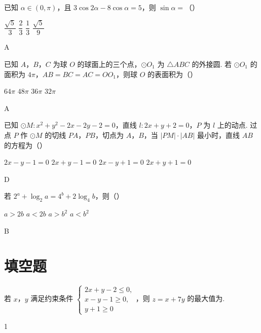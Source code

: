 \begin{problem}
已知 \(\alpha\in\left( 0,\pi \right)\)，且 \(3\cos 2\alpha-8\cos\alpha=5\)，则 \(\sin\alpha=\)（\quad）

\choices
    {\(\dfrac{\sqrt{5}}{3}\)}
    {\(\dfrac{2}{3}\)}
    {\(\dfrac{1}{3}\)}
    {\(\dfrac{\sqrt{5}}{9}\)}

\begin{answer}
A
\end{answer}
\end{problem}

\begin{problem}
已知 \(A\)，\(B\)，\(C\) 为球 \(O\) 的球面上的三个点，\(\odot O_1\) 为 \(\triangle ABC\) 的外接圆. 若 \(\odot O_1\) 的面积为 \(4\pi\)，\(AB=BC=AC=OO_1\)，则球 \(O\) 的表面积为（\quad）

\choices
    {\(64\pi\)}
    {\(48\pi\)}
    {\(36\pi\)}
    {\(32\pi\)}

\begin{answer}
A
\end{answer}
\end{problem}

\begin{problem}
已知 \(\odot M:x^2+y^2-2x-2y-2=0\)，直线 \(l:2x+y+2=0\)，\(P\) 为 \(l\) 上的动点. 过点 \(P\) 作 \(\odot M\) 的切线 \(PA\)，\(PB\)，切点为 \(A\)，\(B\)，当 \(\left\lvert PM \right\rvert\cdot \left\lvert AB \right\rvert\) 最小时，直线 \(AB\) 的方程为（\quad）

\choices
    {\(2x-y-1=0\)}
    {\(2x+y-1=0\)}
    {\(2x-y+1=0\)}
    {\(2x+y+1=0\)}

\begin{answer}
D
\end{answer}
\end{problem}

\begin{problem}
若 \(2^a+\log_2 a=4^b+2\log_4 b\)，则（\quad）

\choices
    {\(a>2b\)}
    {\(a<2b\)}
    {\(a>b^2\)}
    {\(a<b^2\)}

\begin{answer}
B
\end{answer}
\end{problem}

\section{填空题}

\begin{problem}
若 \(x\)，\(y\) 满足约束条件 \(\begin{cases}
2x+y-2\le 0,\\
x-y-1\ge 0,\\
y+1\ge 0
\end{cases}\)，则 \(z=x+7y\) 的最大值为\fillinblank{}.

\begin{answer}
1
\end{answer}
\end{problem}

